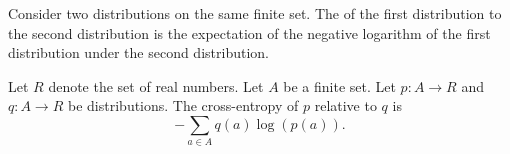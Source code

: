 


Consider two distributions
on the same finite set.
The 
of the first distribution
 to the
second distribution
is the expectation of the
negative logarithm of the first distribution
under the second distribution.


Let $R$ denote the set of
real numbers. Let
$A$ be a finite set.
Let $p: A \to R$ and
$q: A \to R$ be distributions.
The cross-entropy of $p$ relative to $q$
is
\[
  -\sum_{a \in A} q(a) \log(p(a)).
\]
